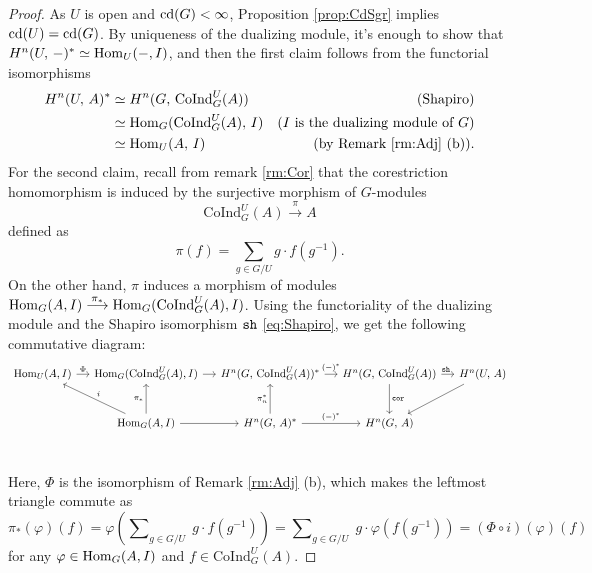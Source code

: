 \documentclass[a4paper, oneside]{memoir}
\begin{document}
\begin{proof}
    As \(U\) is open and \(\operatorname{cd}(G)<\infty\), Proposition \ref{prop:CdSgr} implies \(\operatorname{cd}(U)=\operatorname{cd}(G)\). By uniqueness of the dualizing module, it's enough to show that
    \(H^{n}( U, \, - )^*\simeq\operatorname{Hom}_U(-,I)\), and then the first claim follows from the functorial isomorphisms
    \begin{align*}
        H^{n}( U, \, A )^* & \simeq H^{n}( G, \, \mathrm{CoInd}_G^U(A) )   & \text{(Shapiro)}                            \\
                      & \simeq \operatorname{Hom}_G(\mathrm{CoInd}_G^U(A),\,I) & \text{($I$ is the dualizing module of $G$)} \\
                      & \simeq \operatorname{Hom}_U(A,\,I)                     & \text{(by Remark \eqref{rm:Adj} (b))}.
    \end{align*}
    For the second claim, recall from remark \ref{rm:Cor} that the corestriction homomorphism is induced by the surjective morphism of \(G\)-modules
    \[\mathrm{CoInd}_G^U(A) \overset{\pi}{\longrightarrow} A\]
    defined as
    \[ \pi(f)= \sum_{g\in G/U}{g\cdot f(g^{-1})}.\]
    On the other hand, $\pi$ induces a morphism of modules \(\operatorname{Hom}_G(A,I)\overset{\pi_*}{\longrightarrow}\operatorname{Hom}_G(\mathrm{CoInd}_G^U(A),I)\).
    Using the functoriality of the dualizing module and the Shapiro isomorphism $\operatorname{\mathtt{sh}}$ \eqref{eq:Shapiro},
    we get the following commutative diagram:
    \[
        \begin{tikzcd}[column sep=small, row sep=large]
            \Hom_U(A,I)
            \rar["\Phi"] &
            \Hom_G(\mathrm{CoInd}_G^U(A), I)
            \rar &
            \H{n}{G}{\mathrm{CoInd}_G^U(A)}^*
            \rar["(-)^*"]&\H{n}{G}{\mathrm{CoInd}_G^U(A)}
            \rar["\sh\ "]
            \ar[d, "\Cor"]&\H{n}{U}{A}\ar[dl] \\
            &
            \Hom_G(A,I) \ar[swap, lu, "i"]
            \ar[u, "\pi_*"]
            \rar &
            \H{n}{G}{A}^*
            \ar[u,"\pi_n^*"]
            \rar["(-)^*"] &
            \H{n}{G}{A} \\
        \end{tikzcd}
    \]
    Here, $\Phi$ is the isomorphism of Remark \ref{rm:Adj} (b),
    which makes the leftmost triangle commute as
    \[
        \pi_*(\varphi)(f) = \varphi\left(\sum\nolimits_{g\in G/U}\;{g\cdot f(g^{-1} )}\right) = \sum\nolimits_{g\in G/U}\;{g\cdot \varphi(f(g^{-1}))} = (\Phi\circ i) (\varphi)(f)
    \]
    for any \(\varphi\in\operatorname{Hom}_G(A,I)\) and \(f\in\mathrm{CoInd}_G^U(A)\).
\end{proof}
\end{document}
